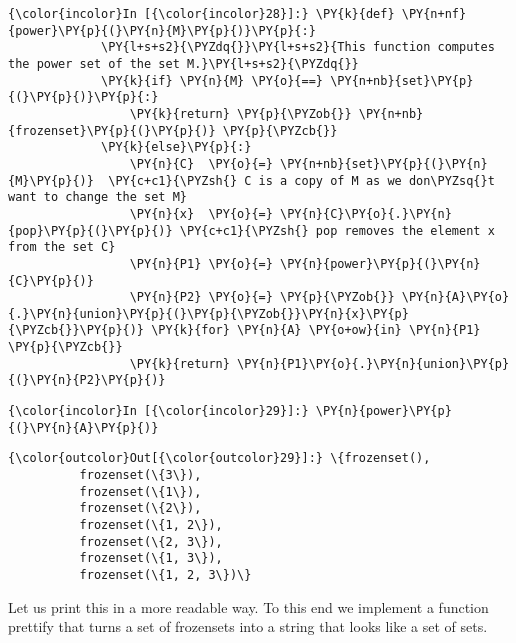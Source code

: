 \begin{Verbatim}[commandchars=\\\{\}]
{\color{incolor}In [{\color{incolor}28}]:} \PY{k}{def} \PY{n+nf}{power}\PY{p}{(}\PY{n}{M}\PY{p}{)}\PY{p}{:}
             \PY{l+s+s2}{\PYZdq{}}\PY{l+s+s2}{This function computes the power set of the set M.}\PY{l+s+s2}{\PYZdq{}}
             \PY{k}{if} \PY{n}{M} \PY{o}{==} \PY{n+nb}{set}\PY{p}{(}\PY{p}{)}\PY{p}{:}
                 \PY{k}{return} \PY{p}{\PYZob{}} \PY{n+nb}{frozenset}\PY{p}{(}\PY{p}{)} \PY{p}{\PYZcb{}}
             \PY{k}{else}\PY{p}{:}
                 \PY{n}{C}  \PY{o}{=} \PY{n+nb}{set}\PY{p}{(}\PY{n}{M}\PY{p}{)}  \PY{c+c1}{\PYZsh{} C is a copy of M as we don\PYZsq{}t want to change the set M}
                 \PY{n}{x}  \PY{o}{=} \PY{n}{C}\PY{o}{.}\PY{n}{pop}\PY{p}{(}\PY{p}{)} \PY{c+c1}{\PYZsh{} pop removes the element x from the set C}
                 \PY{n}{P1} \PY{o}{=} \PY{n}{power}\PY{p}{(}\PY{n}{C}\PY{p}{)}
                 \PY{n}{P2} \PY{o}{=} \PY{p}{\PYZob{}} \PY{n}{A}\PY{o}{.}\PY{n}{union}\PY{p}{(}\PY{p}{\PYZob{}}\PY{n}{x}\PY{p}{\PYZcb{}}\PY{p}{)} \PY{k}{for} \PY{n}{A} \PY{o+ow}{in} \PY{n}{P1} \PY{p}{\PYZcb{}}
                 \PY{k}{return} \PY{n}{P1}\PY{o}{.}\PY{n}{union}\PY{p}{(}\PY{n}{P2}\PY{p}{)}
\end{Verbatim}


\begin{Verbatim}[commandchars=\\\{\}]
{\color{incolor}In [{\color{incolor}29}]:} \PY{n}{power}\PY{p}{(}\PY{n}{A}\PY{p}{)}
\end{Verbatim}


\begin{Verbatim}[commandchars=\\\{\}]
{\color{outcolor}Out[{\color{outcolor}29}]:} \{frozenset(),
          frozenset(\{3\}),
          frozenset(\{1\}),
          frozenset(\{2\}),
          frozenset(\{1, 2\}),
          frozenset(\{2, 3\}),
          frozenset(\{1, 3\}),
          frozenset(\{1, 2, 3\})\}
\end{Verbatim}
Let us print this in a more readable way. To this end we implement a
function prettify that turns a set of frozensets into a string that
looks like a set of sets.

